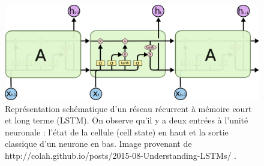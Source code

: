 \begin{figure}[h]
  \centering
  \includegraphics[width=14cm]{./Chapitre3/figures/lstm.png}
  \caption{Représentation schématique d'un réseau récurrent à mémoire court et long terme (LSTM). On observe qu'il y a deux entrées à l'unité neuronale : l'état de la cellule (cell state) en haut et la sortie classique d'un neurone en bas. Image provenant de http://colah.github.io/posts/2015-08-Understanding-LSTMs/ .}
  \label{fig:lstm}
\end{figure}
